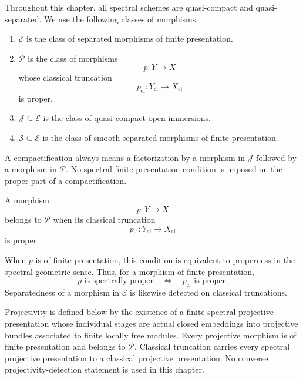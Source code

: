 \begin{convention}
\label{conv:proper-geometric-classes}
Throughout this chapter, all spectral schemes are quasi-compact and
quasi-separated.  We use the following classes of morphisms.

\begin{enumerate}
    \item \(\mathcal E\) is the class of separated morphisms of finite
    presentation.

    \item \(\mathcal P\) is the class of morphisms
    \[
        p:Y\longrightarrow X
    \]
    whose classical truncation
    \[
        p_{\mathrm{cl}}:
        Y_{\mathrm{cl}}
        \longrightarrow
        X_{\mathrm{cl}}
    \]
    is proper.

    \item \(\mathcal J\subseteq\mathcal E\) is the class of quasi-compact open
    immersions.

    \item \(\mathcal S\subseteq\mathcal E\) is the class of smooth separated
    morphisms of finite presentation.
\end{enumerate}

A compactification always means a factorization by a morphism in
\(\mathcal J\) followed by a morphism in \(\mathcal P\).  No spectral
finite-presentation condition is imposed on the proper part of a
compactification.
\end{convention}

\begin{convention}
\label{conv:spectral-properness}
A morphism
\[
    p:Y\longrightarrow X
\]
belongs to \(\mathcal P\) when its classical truncation
\[
    p_{\mathrm{cl}}:
    Y_{\mathrm{cl}}
    \longrightarrow
    X_{\mathrm{cl}}
\]
is proper.

When \(p\) is of finite presentation, this condition is equivalent to
properness in the spectral-geometric sense.  Thus, for a morphism of finite
presentation,
\[
    p\text{ is spectrally proper}
    \quad\Longleftrightarrow\quad
    p_{\mathrm{cl}}\text{ is proper}.
\]
Separatedness of a morphism in \(\mathcal E\) is likewise detected on
classical truncations.

Projectivity is defined below by the existence of a finite spectral
projective presentation whose individual stages are actual closed embeddings
into projective bundles associated to finite locally free modules.  Every
projective morphism is of finite presentation and belongs to \(\mathcal P\).
Classical truncation carries every spectral projective presentation to a
classical projective presentation.  No converse projectivity-detection
statement is used in this chapter.
\end{convention}

